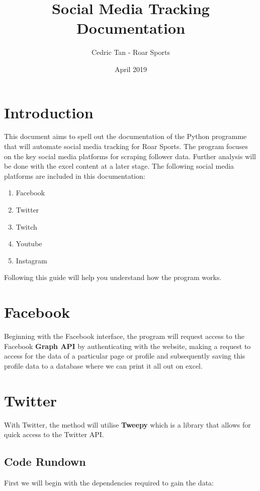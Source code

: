 \documentclass[12pt, letterpaper]{article}
\title{Social Media Tracking Documentation}
\author{Cedric Tan - Roar Sports}
\date{April 2019}
\begin{document}
\maketitle
{}

\newpage

\tableofcontents
\newpage

\section{Introduction}
This document aims to spell out the documentation of the Python programme that will automate social media tracking for Roar Sports. The program focuses on the key social media platforms for scraping follower data. Further analysis will be done with the excel content at a later stage. The following social media platforms are included in this documentation:
\begin{enumerate}
	\item Facebook
	\item Twitter
	\item Twitch
	\item Youtube
	\item Instagram
\end{enumerate}

Following this guide will help you understand how the program works.

\section{Facebook}
Beginning with the Facebook interface, the program will request access to the Facebook \textbf{Graph API} by authenticating with the website, making a request to access for the data of a particular page or profile and subsequently saving this profile data to a database where we can print it all out on excel.


\newpage
\section{Twitter}
With Twitter, the method will utilise \textbf{Tweepy} which is a library that allows for quick access to the Twitter API.
\subsection{Code Rundown}
First we will begin with the dependencies required to gain the data:
\end{document}
